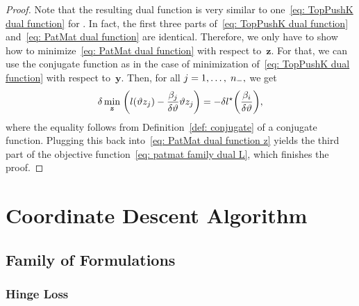 \begin{proof}
  Note that the resulting dual function is very similar to one~\eqref{eq: TopPushK dual function} for \TopPushK. In fact, the first three parts of~\eqref{eq: TopPushK dual function} and~\eqref{eq: PatMat dual function} are identical. Therefore, we only have to show how to minimize~\eqref{eq: PatMat dual function} with respect to~$\bm{z}.$ For that, we can use the conjugate function as in the case of minimization of~\eqref{eq: TopPushK dual function} with respect to~$\bm{y}.$  Then, for all $j = 1, \ldots, \; n_{-},$ we get 
  \begin{equation*}
    \delta \min_{\bm{z}} \; \Brac{l(\vartheta z_j) - \frac{\beta_j}{\delta\vartheta } \vartheta z_j} = - \delta l^{\star} \Brac{\frac{\beta_i}{\delta\vartheta }},
  \end{equation*}
  where the equality follows from Definition~\ref{def: conjugate} of a conjugate function. Plugging this back into~\eqref{eq: PatMat dual function z} yields the third part of the objective function~\eqref{eq: patmat family dual L}, which finishes the proof.
\end{proof}

\section{Coordinate Descent Algorithm}
\subsection{Family of \TopPushK Formulations}\label{sec: toppushk family coordinate proofs}
\subsubsection{Hinge Loss}

